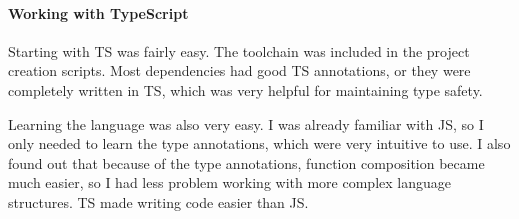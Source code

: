\paragraph*{Working with TypeScript}\label{sec:working-with-typescript}

Starting with \acl{TS} was fairly easy.
The toolchain was included in the project creation scripts.
Most dependencies had good \acl{TS} annotations,
or they were completely written in \acl{TS},
which was very helpful for maintaining type safety.

Learning the language was also very easy.
I was already familiar with \acl{JS},
so I only needed to learn the type annotations,
which were very intuitive to use.
I also found out that because of the type annotations,
function composition became much easier,
so I had less problem working with more complex
language structures.
\Acl{TS} made writing code easier than \acl{JS}.

